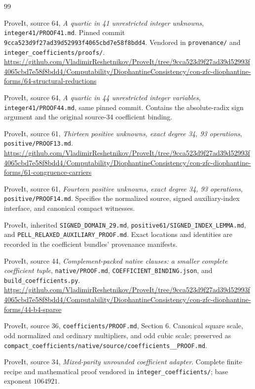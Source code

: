 \documentclass[11pt,a4paper]{article}
\theoremstyle{definition}
\newcommand{\src}[1]{{\urlstyle{tt}\nolinkurl{#1}}}
\begin{document}
\begin{thebibliography}{99}
\raggedright
{}
ProveIt, source 64, \emph{A quartic in 41 unrestricted integer
unknowns}, \src{integer41/PROOF41.md}. Pinned commit
\src{9cca523d9f27ad39d52993f4065cbd7e58f8bdd4}.
Vendored in \src{provenance/} and \src{integer_coefficients/proofs/}.
\url{https://github.com/VladimirReshetnikov/ProveIt/tree/9cca523d9f27ad39d52993f4065cbd7e58f8bdd4/Computability/DiophantineConsistency/con-zfc-diophantine-forms/64-structural-reductions}

ProveIt, source 64, \emph{A quartic in 44 unrestricted integer
variables}, \src{integer41/PROOF44.md}, same pinned commit.
Contains the absolute-radix sign argument and the original
source-34 coefficient binding.

ProveIt, source 61, \emph{Thirteen positive unknowns, exact
degree 34, 93 operations}, \src{positive/PROOF13.md}.
\url{https://github.com/VladimirReshetnikov/ProveIt/tree/9cca523d9f27ad39d52993f4065cbd7e58f8bdd4/Computability/DiophantineConsistency/con-zfc-diophantine-forms/61-congruence-carriers}

ProveIt, source 61, \emph{Fourteen positive unknowns, exact
degree 34, 93 operations}, \src{positive/PROOF14.md}.
Specifies the normalized source, signed auxiliary-index
interface, and canonical compact witnesses.

ProveIt, inherited \src{SIGNED_DOMAIN_29.md},
\src{positive61/SIGNED_INDEX_LEMMA.md}, and
\src{PELL_RELAXED_AUXILIARY_PROOF.md}.
Exact locations and identities are recorded in the coefficient
bundles' provenance manifests.

ProveIt, source 44, \emph{Complement-packed native clauses:
a smaller complete coefficient tuple},
\src{native/PROOF.md}, \src{COEFFICIENT_BINDING.json}, and
\src{build_coefficients.py}.
\url{https://github.com/VladimirReshetnikov/ProveIt/tree/9cca523d9f27ad39d52993f4065cbd7e58f8bdd4/Computability/DiophantineConsistency/con-zfc-diophantine-forms/44-b4-sparse}

ProveIt, source 36, \src{coefficients/PROOF.md}, Section 6.
Canonical square scale, odd normalized and ordinary multipliers,
and odd cubic scale; preserved as
\src{compact_coefficients/native/source/coefficients__PROOF.md}.

ProveIt, source 34, \emph{Mixed-parity unrounded coefficient
adapter}. Complete finite recipe and mathematical proof
vendored in \src{integer_coefficients/}; base exponent \(1064921\).


\end{thebibliography}
\end{document}
